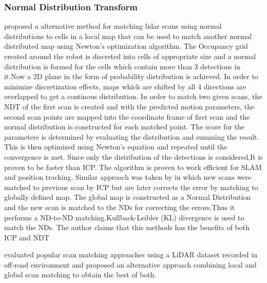 \subsubsection*{Normal Distribution Transform}
    \cite{P.Biber} proposed a alternative method for matching lidar scans using normal distributions to cells in a local map that can be used to match another normal distributed map using Newton's optimization 
algorithm. The Occupancy grid created around the robot is discreted into cells of appropriate size and a normal distribution is formed for the cells which contain more than 3 detections in it.Now a 2D plane in 
the form of probability distribution is achieved. In order to minimize discretization effects, maps which are shifted by all 4 directions are overlapped to get a continous distribution.
    In order to match two given scans, the NDT of the first scan is created and with the predicted motion parameters, the second scan points are mapped into the coordinate frame of first 
scan and the normal distribution is constructed for each matched point. The score for the parameters is determined by evaluating the distribution and summing the result. This is then optimized using
Newton's equation and repeated until the convergence is met. Since only the distribution of the detections is considered,It is proven to be faster than ICP.
 The algorithm is proven to work efficient for SLAM and position tracking.
    Similar approach was taken by \cite{K.Ryu} in which new scans were matched to previous scan by ICP but are later corrects the error by matching to globally defined map. The global map is constructed as a
Normal Distribution and the new scan is matched to the NDs for correcting the errors.Thus it performs a ND-to-ND matching.Kullback-Leibler (KL) divergence is used to match the NDs.
The author claims that this methods has the benefits of both ICP and NDT

\cite{HaoFU} evaluated popular scan matching approaches using a LiDAR dataset recorded in off-road environment and proposed an alternative approach combining local and global  scan matching to obtain the 
best of both.

